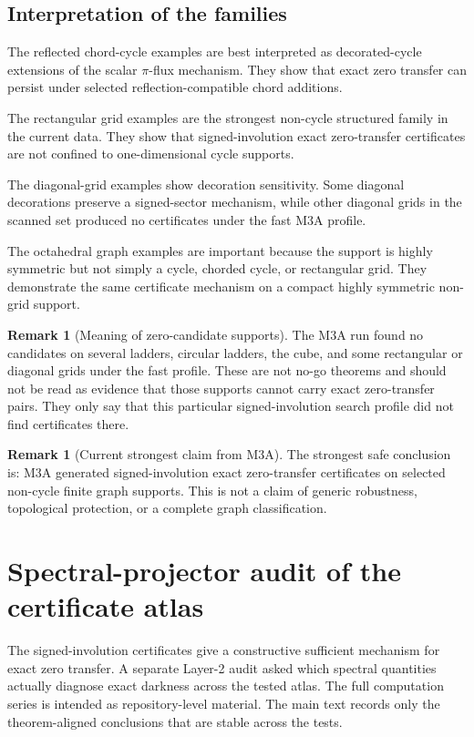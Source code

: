 \documentclass[11pt]{article}
\theoremstyle{definition}
\newtheorem{remark}[theorem]{Remark}
\begin{document}
\subsection{Interpretation of the families}
The reflected chord-cycle examples are best interpreted as decorated-cycle extensions of the scalar $\pi$-flux mechanism. They show that exact zero transfer can persist under selected reflection-compatible chord additions.

The rectangular grid examples are the strongest non-cycle structured family in the current data. They show that signed-involution exact zero-transfer certificates are not confined to one-dimensional cycle supports.

The diagonal-grid examples show decoration sensitivity. Some diagonal decorations preserve a signed-sector mechanism, while other diagonal grids in the scanned set produced no certificates under the fast M3A profile.

The octahedral graph examples are important because the support is highly symmetric but not simply a cycle, chorded cycle, or rectangular grid. They demonstrate the same certificate mechanism on a compact highly symmetric non-grid support.

\begin{remark}[Meaning of zero-candidate supports]
The M3A run found no candidates on several ladders, circular ladders, the cube, and some rectangular or diagonal grids under the fast profile. These are not no-go theorems and should not be read as evidence that those supports cannot carry exact zero-transfer pairs. They only say that this particular signed-involution search profile did not find certificates there.
\end{remark}

\begin{remark}[Current strongest claim from M3A]
The strongest safe conclusion is: M3A generated signed-involution exact zero-transfer certificates on selected non-cycle finite graph supports. This is not a claim of generic robustness, topological protection, or a complete graph classification.
\end{remark}


\section{Spectral-projector audit of the certificate atlas}
The signed-involution certificates give a constructive sufficient mechanism for exact zero transfer.  A separate Layer-2 audit asked which spectral quantities actually diagnose exact darkness across the tested atlas.  The full computation series is intended as repository-level material.  The main text records only the theorem-aligned conclusions that are stable across the tests.
\end{document}
